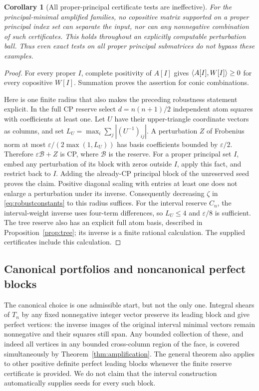 \documentclass[11pt]{article}
\newtheorem{corollary}[theorem]{Corollary}
\theoremstyle{definition}\newtheorem{definition}[theorem]{Definition}
\theoremstyle{remark}\newtheorem{remark}[theorem]{Remark}
\begin{document}
\begin{corollary}[All proper-principal certificate tests are ineffective]\label{cor:principaltests}
For the principal-minimal amplified families, no copositive matrix supported on a proper principal index set can separate the input, nor can any nonnegative combination of such certificates. This holds throughout an explicitly computable perturbation ball. Thus even exact tests on \emph{all} proper principal submatrices do not bypass these examples.
\end{corollary}
\begin{proof}
For every proper $I$, complete positivity of $A[I]$ gives $\langle A[I],W[I]\rangle\ge0$ for every copositive $W[I]$. Summation proves the assertion for conic combinations.

Here is one finite radius that also makes the preceding robustness statement explicit. In the full CP reserve select $d=n(n+1)/2$ independent atom squares with coefficients at least one. Let $U$ have their upper-triangle coordinate vectors as columns, and set $L_U=\max_i\sum_j|(U^{-1})_{ij}|$. A perturbation $Z$ of Frobenius norm at most $\varepsilon/(2\max(1,L_U))$ has basis coefficients bounded by $\varepsilon/2$. Therefore $\varepsilon\mathcal B+Z$ is CP, where $\mathcal B$ is the reserve. For a proper principal set $I$, embed any perturbation of its block with zeros outside $I$, apply this fact, and restrict back to $I$. Adding the already-CP principal block of the unreserved seed proves the claim. Positive diagonal scaling with entries at least one does not enlarge a perturbation under its inverse. Consequently decreasing $\zeta$ in \eqref{eq:robustconstants} to this radius suffices. For the interval reserve $C_n$, the interval-weight inverse uses four-term differences, so $L_U\le4$ and $\varepsilon/8$ is sufficient. The tree reserve also has an explicit full atom basis, described in Proposition~\ref{prop:tree}; its inverse is a finite rational calculation. The supplied certificates include this calculation.
\end{proof}

\subsection{Canonical portfolios and noncanonical perfect blocks}
The canonical choice is one admissible start, but not the only one. Integral shears of $T_n$ by any fixed nonnegative integer vector preserve its leading block and give perfect vertices: the inverse images of the original interval minimal vectors remain nonnegative and their squares still span. Any bounded collection of these, and indeed all vertices in any bounded cross-column region of the face, is covered simultaneously by Theorem~\ref{thm:amplification}. The general theorem also applies to other positive definite perfect leading blocks whenever the finite reserve certificate is provided. We do not claim that the interval construction automatically supplies seeds for every such block.
\end{document}
